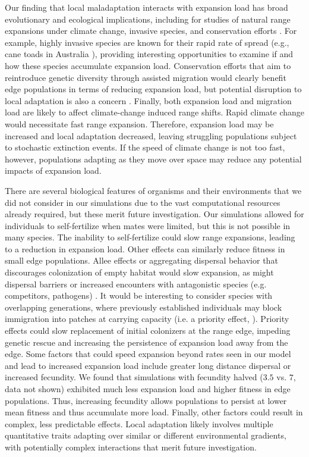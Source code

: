 Our finding that local maladaptation interacts with expansion load has broad evolutionary and ecological implications, including for studies of natural range expansions under climate change, invasive species, and conservation efforts \citep{Hunter:1994}. For example, highly invasive species are known for their rapid rate of spread (e.g., cane toads in Australia \citealt{Phillips:2006}), providing interesting opportunities to examine if and how these species accumulate expansion load. Conservation efforts that aim to reintroduce genetic diversity through assisted migration would clearly benefit edge populations in terms of reducing expansion load, but potential disruption to local adaptation is also a concern \citep{Aitken:2013}. Finally, both expansion load and migration load are likely to affect climate-change induced range shifts. Rapid climate change would necessitate fast range expansion. Therefore, expansion load may be increased and local adaptation decreased, leaving struggling populations subject to stochastic extinction events. If the speed of climate change is not too fast, however, populations adapting as they move over space may reduce any potential impacts of expansion load. 

There are several biological features of organisms and their environments that we did not consider in our simulations due to the vast computational resources already required, but these merit future investigation. Our simulations allowed for individuals to self-fertilize when mates were limited, but this is not possible in many species. The inability to self-fertilize could slow range expansions, leading to a reduction in expansion load. Other effects can similarly reduce fitness in small edge populations. Allee effects \citep{Taylor:2005} or aggregating dispersal behavior that discourages colonization of empty habitat \citep{Altwegg:2013} would slow expansion, as might dispersal barriers or increased encounters with antagonistic species (e.g. competitors, pathogens) \citep{Case:2005, Kubisch:2013}. It would be interesting to consider species with overlapping generations, where previously established individuals may block immigration into patches at carrying capacity (i.e. a priority effect, \citealt{Atkins:2010}). Priority effects could slow replacement of initial colonizers at the range edge, impeding genetic rescue and increasing the persistence of expansion load away from the edge. Some factors that could speed expansion beyond rates seen in our model and lead to increased expansion load include greater long distance dispersal or increased fecundity. We found that simulations with fecundity halved ($3.5$ vs. $7$, data not shown) exhibited much less expansion load and higher fitness in edge populations. Thus, increasing fecundity allows populations to persist at lower mean fitness and thus accumulate more load. Finally, other factors could result in complex, less predictable effects.  Local adaptation likely involves multiple quantitative traits adapting over similar or different environmental gradients, with potentially complex interactions that merit future investigation.

